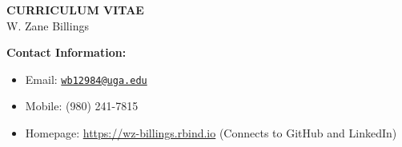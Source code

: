 \documentclass[11pt]{article}
\begin{document}
\begin{center}
\large{
	{\bf CURRICULUM VITAE} \\
	W. Zane Billings \\}
	\hrulefill
\end{center}

\normalsize

{\bf Contact Information:}
\begin{itemize}[noitemsep]
\item Email: \href{mailto:wb12984@uga.edu}{\texttt{wb12984@uga.edu}}
\item Mobile: (980) 241-7815
\item Homepage: \url{https://wz-billings.rbind.io} (Connects to GitHub and LinkedIn)
\end{itemize}

\vspace{0.2in}


\vspace{0.2in}


\vspace{0.2in}


\vspace{0.2in}


\vspace{0.2in}


\vspace{0.2in}


\vspace{0.2in}

\end{document}
